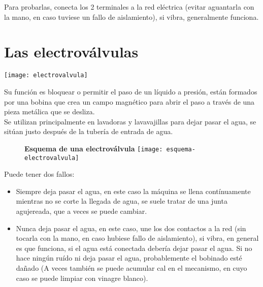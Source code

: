 Para probarlas, conecta los 2 terminales a la red eléctrica (evitar aguantarla con la mano, en caso tuviese un fallo de aislamiento), si vibra, generalmente funciona.

\newpage
\section{Las electroválvulas}

\noindent\begin{minipage}[t]{0.4\textwidth}\vspace{0pt}
\texttt{[image: electrovalvula]}
\end{minipage}
\hfill%
\begin{minipage}[t]{0.5\textwidth}\vspace{\fill}
\vspace{\fill}
\begin{flushleft}
Su función es bloquear o permitir el paso de un líquido a presión, están formados por una bobina que crea un campo magnético
para abrir el paso a través de una pieza metálica
que se desliza.\\

Se utilizan principalmente en lavadoras y lavavajillas para dejar pasar el agua, se sitúan justo después de la tubería de entrada de agua.

\end{flushleft}
\vspace{\fill}
\end{minipage}
\vspace{1em}

\begin{figure}[h]
\centering
\textbf{Esquema de una electroválvula}
\texttt{[image: esquema-electrovalvula]}
\end{figure}

Puede tener dos fallos:
\begin{itemize}
\item Siempre deja pasar el agua, en este caso la máquina se llena contínuamente mientras no se corte la llegada de agua, se suele tratar de una junta agujereada, que a veces se puede cambiar.
\item Nunca deja pasar el agua, en este caso, une los dos contactos a la red (sin tocarla con la mano, en caso hubiese fallo de aislamiento), si vibra, en general es que funciona, si el agua está conectada debería dejar pasar el agua. Si no hace ningún ruído ni deja pasar el agua, probablemente el bobinado esté dañado (A veces también se puede acumular cal en el mecanismo, en cuyo caso se puede limpiar con vinagre blanco).
\end{itemize}
\newpage

